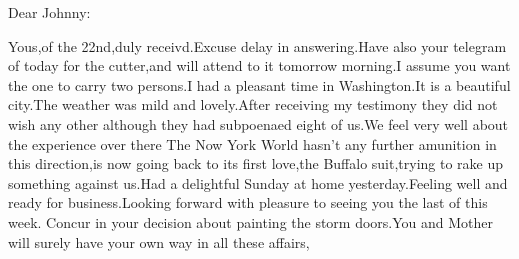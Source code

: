 \documentclass[11pt, oneside]{letter}   	%
\begin{document}
\begin{letter}{}%

\address{26 Broadway \\New York}
\date{November 28th 1887}

\opening{Dear Johnny:}
\setlength{\parindent}{0.5cm}
Yous,of the 22nd,duly receivd.Excuse delay in answering.Have also your telegram of today for the cutter,and will attend to it tomorrow morning.I assume you want the one to carry two persons.I had a pleasant time in Washington.It is a beautiful city.The weather was mild and lovely.After receiving my testimony they did not wish any other although they had subpoenaed eight of us.We feel very well about the experience over there The Now York World hasn't any further amunition in this direction,is now going back to its first love,the Buffalo suit,trying to rake up something against us.Had a delightful Sunday at home yesterday.Feeling well and ready for business.Looking forward with pleasure to seeing you the last of this week.
Concur in your decision about painting the storm doors.You and Mother will surely have your own way in all these affairs,


\end{letter}
\end{document}

